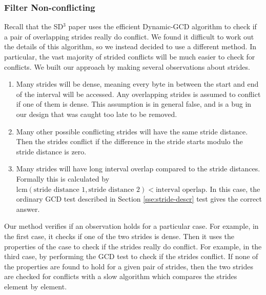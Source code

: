 \documentclass[12pt,twoside]{reedthesis}
\begin{document}
		
		\subsubsection{Filter Non-conflicting}
		
			Recall that the SD$^3$ paper uses the efficient Dynamic-GCD algorithm to check if a pair of overlapping strides really do conflict. We found it difficult to work out the details of this algorithm, so we instead decided to use a different method. In particular, the vast majority of strided conflicts will be much easier to check for conflicts. We built our approach by making several observations about strides.
			
			\begin{enumerate}
				\item Many strides will be dense, meaning every byte in between the start and end of the interval will be accessed. Any overlapping strides is assumed to conflict if one of them is dense. This assumption is in general false, and is a bug in our design that was caught too late to be removed. 
				\item Many other possible conflicting strides will have the same stride distance. Then the strides conflict if the difference in the stride starts modulo the stride distance is zero. 
				\item Many strides will have long interval overlap compared to the stride distances. Formally this is calculated by $\text{lcm}(\text{stride distance 1}, \text{stride distance 2}) < \text{interval operlap}$. In this case, the ordinary GCD test described in Section \ref{sse:stride-descr} test gives the correct answer.
			\end{enumerate}
			Our method verifies if an observation holds for a particular case. For example, in the first case, it checks if one of the two strides is dense. Then it uses the properties of the case to check if the strides really do conflict. For example, in the third case, by performing the GCD test to check if the strides conflict. 
			If none of the properties are found to hold for a given pair of strides, then the two strides are checked for conflicts with a slow algorithm which compares the strides element by element.
			 
			
\end{document}

